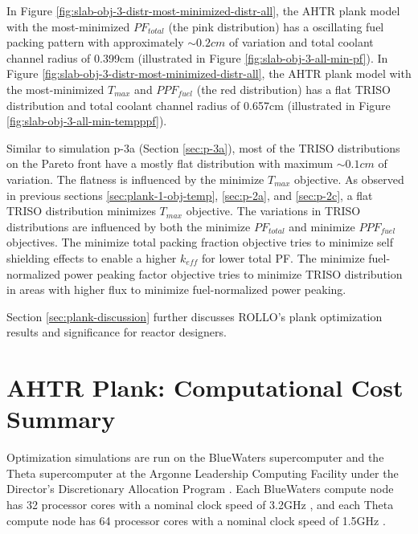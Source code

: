 In Figure \ref{fig:slab-obj-3-distr-most-minimized-distr-all}, the \gls{AHTR} plank model 
with the most-minimized $PF_{total}$ (the pink distribution) has a oscillating fuel 
packing pattern with approximately $\sim0.2cm$ of variation and total coolant channel radius 
of 0.399cm (illustrated in Figure \ref{fig:slab-obj-3-all-min-pf}).
In Figure \ref{fig:slab-obj-3-distr-most-minimized-distr-all}, the \gls{AHTR} plank model with 
the most-minimized $T_{max}$ and $PPF_{fuel}$ (the red distribution) 
has a flat TRISO distribution and total coolant channel radius of 0.657cm 
(illustrated in Figure \ref{fig:slab-obj-3-all-min-tempppf}). 

Similar to simulation p-3a (Section \ref{sec:p-3a}), most of the \gls{TRISO} distributions 
on the Pareto front have a mostly flat distribution with maximum $\sim0.1cm$ of 
variation. 
The flatness is influenced by the minimize $T_{max}$ objective. 
As observed in previous sections \ref{sec:plank-1-obj-temp}, \ref{sec:p-2a}, and 
\ref{sec:p-2c}, a flat \gls{TRISO} distribution minimizes $T_{max}$ objective.
The variations in \gls{TRISO} distributions are influenced by both the minimize 
$PF_{total}$ and minimize $PPF_{fuel}$ objectives. 
The minimize total packing fraction objective tries to minimize self shielding effects 
to enable a higher $k_{eff}$ for lower total PF. 
The minimize fuel-normalized power peaking factor objective tries to minimize 
TRISO distribution in areas with higher flux to minimize fuel-normalized power peaking.

Section \ref{sec:plank-discussion} further discusses \gls{ROLLO}'s plank 
optimization results and significance for reactor designers.

\pagebreak
\section{AHTR Plank: Computational Cost Summary}
\label{sec:plank-compute-cost}
Optimization simulations are run on the BlueWaters supercomputer \cite{ncsa_about_2017} and
the Theta supercomputer at the Argonne Leadership Computing Facility under the Director's 
Discretionary Allocation Program \cite{noauthor_argonne_2022}. 
Each BlueWaters compute node has 32 processor cores with a nominal clock speed of 3.2GHz
\cite{ncsa_about_2017}, and each Theta compute node has 64 processor cores with a nominal 
clock speed of 1.5GHz \cite{noauthor_argonne_2022}.  

